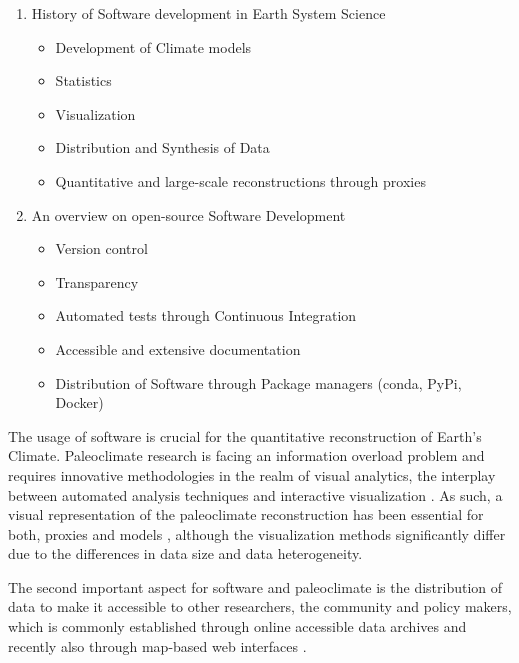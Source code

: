 \begin{refsection}
\begin{enumerate}
	\item History of Software development in Earth System Science
	\begin{itemize}
		\item Development of Climate models
		\item Statistics
		\item Visualization
		\item Distribution and Synthesis of Data
		\item Quantitative and large-scale reconstructions through proxies
	\end{itemize}
	\item An overview on open-source Software Development
	\begin{itemize}
		\item
		Version control
		\item
		Transparency
		\item
		Automated tests through Continuous Integration
		\item
		Accessible and extensive documentation
		\item
		Distribution of Software through Package managers (conda, PyPi,
		Docker)
	\end{itemize}
\end{enumerate}

The usage of software is crucial for the quantitative reconstruction of Earth's Climate. Paleoclimate research is facing an information overload problem and requires innovative methodologies in the realm of visual analytics, the interplay between automated analysis techniques and interactive visualization \citep{KeimAndrienkoFeketeEtAl2008, Nocke2014}. As such, a visual representation of the paleoclimate reconstruction has been essential for both, proxies \citep{Nichols1967, Bradley1985, Grimm1988} and models \citep{Phillips1956, RautenhausBoettingerSiemenEtAl2018, NockeSterzelBoettingerEtAl2008, Nocke2014, BoettingerRoeber2019}, although the visualization methods significantly differ due to the differences in data size and data heterogeneity.

The second important aspect for software and paleoclimate is the distribution of data to make it accessible to other researchers, the community and policy makers, which is commonly established through online accessible data archives and recently also through map-based web interfaces \citep{WilliamsGrimmBloisEtAl2018, BollietBrockmannMassonDelmotteEtAl2016}.


\end{refsection}
